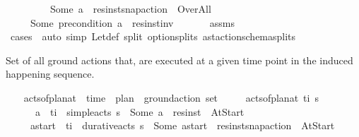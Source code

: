 \begin{isabellebody}
\ \ \ \ \ \ \ \ \ {\isachardoublequoteopen}Some\ a\ {\isacharequal}{\kern0pt}\ res{\isacharunderscore}{\kern0pt}inst{\isacharunderscore}{\kern0pt}snap{\isacharunderscore}{\kern0pt}action\ {\isasympi}\ Over{\isacharunderscore}{\kern0pt}All{\isachardoublequoteclose}\isanewline
\ \ \ \ \ {\isachardoublequoteopen}Some\ {\isacharparenleft}{\kern0pt}precondition\ a{\isacharparenright}{\kern0pt}\ {\isacharequal}{\kern0pt}\ res{\isacharunderscore}{\kern0pt}inst{\isacharunderscore}{\kern0pt}inv\ {\isasympi}{\isachardoublequoteclose}\isanewline
%
\isadelimproof
\ \ \ \ %
\endisadelimproof
%
\isatagproof
{}\isamarkupfalse%
\ assms\isanewline
\ \ \ \ \isamarkupfalse%
\ {\isacharparenleft}{\kern0pt}cases\ {\isasympi}{\isacharparenright}{\kern0pt}\ {\isacharparenleft}{\kern0pt}auto\ simp{\isacharcolon}{\kern0pt}\ Let{\isacharunderscore}{\kern0pt}def\ split{\isacharcolon}{\kern0pt}\ option{\isachardot}{\kern0pt}splits\ ast{\isacharunderscore}{\kern0pt}action{\isacharunderscore}{\kern0pt}schema{\isachardot}{\kern0pt}splits{\isacharparenright}{\kern0pt}%
\endisatagproof
{\isafoldproof}%
%
\isadelimproof
%
\endisadelimproof
%
\begin{isamarkuptext}%
Set of all ground actions that, are executed at a given time point in the 
  induced happening sequence.%
\end{isamarkuptext}\isamarkuptrue%
\ \ \isamarkupfalse%
\ acts{\isacharunderscore}{\kern0pt}of{\isacharunderscore}{\kern0pt}plan{\isacharunderscore}{\kern0pt}at\ {\isacharcolon}{\kern0pt}{\isacharcolon}{\kern0pt}\ {\isachardoublequoteopen}time\ {\isasymRightarrow}\ plan\ {\isasymRightarrow}\ ground{\isacharunderscore}{\kern0pt}action\ set{\isachardoublequoteclose}\ \isanewline
\ \ \ \ {\isachardoublequoteopen}acts{\isacharunderscore}{\kern0pt}of{\isacharunderscore}{\kern0pt}plan{\isacharunderscore}{\kern0pt}at\ t\isactrlsub i\ {\isasympi}s\ {\isacharequal}{\kern0pt}\ \isanewline
\ \ \ \ \ \ {\isacharbraceleft}{\kern0pt}a\isactrlsub {\isasympi}{\isachardot}{\kern0pt}\ {\isasymexists}{\isasympi}{\isachardot}{\kern0pt}\ {\isacharparenleft}{\kern0pt}t\isactrlsub i{\isacharcomma}{\kern0pt}{\isasympi}{\isacharparenright}{\kern0pt}\ {\isasymin}\ simple{\isacharunderscore}{\kern0pt}acts\ {\isasympi}s\ {\isasymand}\ Some\ a\isactrlsub {\isasympi}\ {\isacharequal}{\kern0pt}\ res{\isacharunderscore}{\kern0pt}inst\ {\isasympi}\ At{\isacharunderscore}{\kern0pt}Start{\isacharbraceright}{\kern0pt}\ \isanewline
\ \ \ \ {\isasymunion}\ {\isacharbraceleft}{\kern0pt}a\isactrlsub s\isactrlsub t\isactrlsub a\isactrlsub r\isactrlsub t{\isachardot}{\kern0pt}\ {\isasymexists}{\isasympi}{\isachardot}{\kern0pt}\ {\isacharparenleft}{\kern0pt}t\isactrlsub i{\isacharcomma}{\kern0pt}{\isasympi}{\isacharparenright}{\kern0pt}\ {\isasymin}\ durative{\isacharunderscore}{\kern0pt}acts\ {\isasympi}s\ {\isasymand}\ Some\ a\isactrlsub s\isactrlsub t\isactrlsub a\isactrlsub r\isactrlsub t\ {\isacharequal}{\kern0pt}\ res{\isacharunderscore}{\kern0pt}inst{\isacharunderscore}{\kern0pt}snap{\isacharunderscore}{\kern0pt}action\ {\isasympi}\ At{\isacharunderscore}{\kern0pt}Start{\isacharbraceright}{\kern0pt}\ \isanewline

\end{isabellebody}
